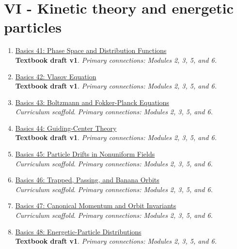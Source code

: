 \documentclass[11pt]{article}
\begin{document}
\section{VI - Kinetic theory and energetic particles}
\begin{enumerate}[leftmargin=2.4em]
\item[\textbf{41.}] \href{run:basics_41_phase_space_and_distribution_functions.pdf}{Basics 41: Phase Space and Distribution Functions}\\[-0.2em]
\textbf{Textbook draft v1}. \textit{Primary connections: Modules 2, 3, 5, and 6.}
\item[\textbf{42.}] \href{run:basics_42_vlasov_equation.pdf}{Basics 42: Vlasov Equation}\\[-0.2em]
\textbf{Textbook draft v1}. \textit{Primary connections: Modules 2, 3, 5, and 6.}
\item[\textbf{43.}] \href{run:basics_43_boltzmann_and_fokker_planck_equations.pdf}{Basics 43: Boltzmann and Fokker-Planck Equations}\\[-0.2em]
\textit{Curriculum scaffold}. \textit{Primary connections: Modules 2, 3, 5, and 6.}
\item[\textbf{44.}] \href{run:basics_44_guiding_center_theory.pdf}{Basics 44: Guiding-Center Theory}\\[-0.2em]
\textbf{Textbook draft v1}. \textit{Primary connections: Modules 2, 3, 5, and 6.}
\item[\textbf{45.}] \href{run:basics_45_particle_drifts_in_nonuniform_fields.pdf}{Basics 45: Particle Drifts in Nonuniform Fields}\\[-0.2em]
\textit{Curriculum scaffold}. \textit{Primary connections: Modules 2, 3, 5, and 6.}
\item[\textbf{46.}] \href{run:basics_46_trapped_passing_and_banana_orbits.pdf}{Basics 46: Trapped, Passing, and Banana Orbits}\\[-0.2em]
\textit{Curriculum scaffold}. \textit{Primary connections: Modules 2, 3, 5, and 6.}
\item[\textbf{47.}] \href{run:basics_47_canonical_momentum_and_orbit_invariants.pdf}{Basics 47: Canonical Momentum and Orbit Invariants}\\[-0.2em]
\textit{Curriculum scaffold}. \textit{Primary connections: Modules 2, 3, 5, and 6.}
\item[\textbf{48.}] \href{run:basics_48_energetic_particle_distributions.pdf}{Basics 48: Energetic-Particle Distributions}\\[-0.2em]
\textbf{Textbook draft v1}. \textit{Primary connections: Modules 2, 3, 5, and 6.}

\end{enumerate}
\end{document}
